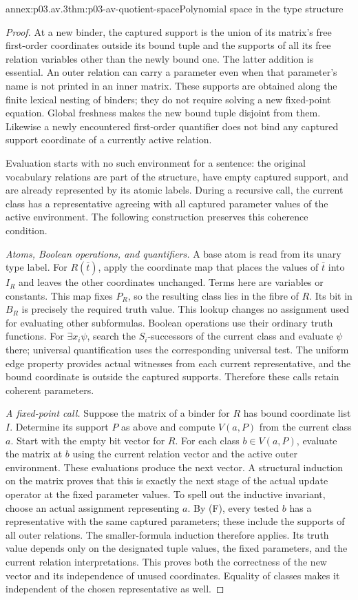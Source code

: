 \begin{annexitem}{annex:p03.av.3}{thm:p03-av-quotient-space}{Polynomial space in the type structure}
\begin{proof}
At a new binder, the captured support is the union of its matrix's
free first-order coordinates outside its bound tuple and the supports
of all its free relation variables other than the newly bound one.
The latter addition is essential. An outer relation can carry a
parameter even when that parameter's name is not printed in an inner
matrix. These supports are obtained along the finite lexical nesting
of binders; they do not require solving a new fixed-point equation.
Global freshness makes the new bound tuple disjoint from them.
Likewise a newly encountered first-order quantifier does not bind
any captured support coordinate of a currently active relation.

Evaluation starts with no such environment for a sentence: the
original vocabulary relations are part of the structure, have empty
captured support, and are already represented by its atomic labels. During a recursive call,
the current class has a representative agreeing with all captured
parameter values of the active environment. The following construction
preserves this coherence condition.

\emph{Atoms, Boolean operations, and quantifiers.} A base atom is
read from its unary type label. For \(R(\bar t)\), apply the
coordinate map that places the values of \(\bar t\) into
\(I_R\) and leaves the other coordinates unchanged. Terms here
are variables or constants. This map fixes \(P_R\), so the
resulting class lies in the fibre of \(R\). Its bit in \(B_R\)
is precisely the required truth value. This lookup changes no
assignment used for evaluating other subformulas. Boolean operations
use their ordinary truth functions. For \(\exists x_i\psi\),
search the \(S_i\)-successors of the current class and evaluate
\(\psi\) there; universal quantification uses the corresponding
universal test. The uniform edge property provides actual witnesses
from each current representative, and the bound coordinate is outside
the captured supports. Therefore these calls retain coherent parameters.

\emph{A fixed-point call.} Suppose the matrix of a binder for
\(R\) has bound coordinate list \(I\). Determine its support
\(P\) as above and compute \(V(a,P)\) from the current
class \(a\). Start with the empty bit vector for \(R\).
For each class \(b\in V(a,P)\), evaluate the matrix at \(b\)
using the current relation vector and the active outer environment.
These evaluations produce the next vector. A structural induction
on the matrix proves that this is exactly the next stage of the
actual update operator at the fixed parameter values. To spell out
the inductive invariant, choose an actual assignment representing
\(a\). By (F), every tested \(b\) has a representative
with the same captured parameters; these include the supports of
all outer relations. The smaller-formula induction therefore applies.
Its truth value depends only on the designated tuple values, the
fixed parameters, and the current relation interpretations. This
proves both the correctness of the new vector and its independence
of unused coordinates. Equality of classes makes it independent of
the chosen representative as well.


\end{proof}
\end{annexitem}
